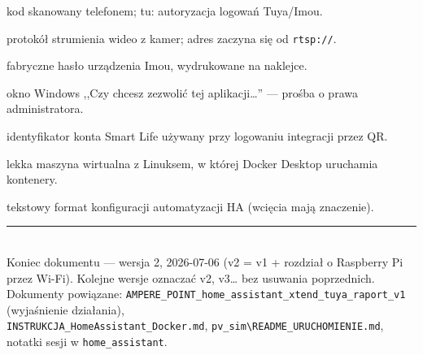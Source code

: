 \documentclass[11pt,a4paper]{article}
\begin{document}
\begin{description}[style=nextline,itemsep=1pt]
\item[QR] kod skanowany telefonem; tu: autoryzacja logowań Tuya/Imou.
\item[RTSP] protokół strumienia wideo z kamer; adres zaczyna się od \texttt{rtsp://}.
\item[Safety code] fabryczne hasło urządzenia Imou, wydrukowane na naklejce.
\item[UAC] okno Windows ,,Czy chcesz zezwolić tej aplikacji\ldots'' --- prośba o prawa administratora.
\item[User Code (kod użytkownika)] identyfikator konta Smart Life używany przy logowaniu integracji przez QR.
\item[WSL2] lekka maszyna wirtualna z Linuksem, w której Docker Desktop uruchamia kontenery.
\item[YAML] tekstowy format konfiguracji automatyzacji HA (wcięcia mają znaczenie).
\end{description}

\vspace{8pt}
\begin{center}
\textcolor{navy}{\rule{0.6\textwidth}{0.4pt}}\\[4pt]
{\small Koniec dokumentu --- wersja 2, 2026-07-06 (v2 = v1 + rozdział o Raspberry Pi przez Wi-Fi). Kolejne wersje oznaczać v2, v3\ldots{} bez usuwania poprzednich.\\
Dokumenty powiązane: \texttt{AMPERE\_POINT\_home\_assistant\_xtend\_tuya\_raport\_v1} (wyjaśnienie działania),\\ \texttt{INSTRUKCJA\_HomeAssistant\_Docker.md}, \texttt{pv\_sim\textbackslash README\_URUCHOMIENIE.md}, notatki sesji w \texttt{home\_assistant}.}
\end{center}
\end{document}
